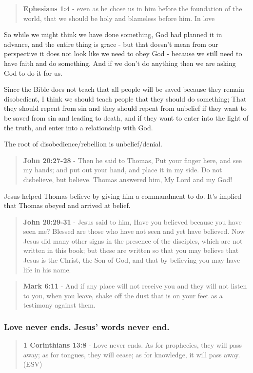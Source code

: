 \documentclass[11pt]{article}
\begin{document}
\begin{quote}
\textbf{Ephesians 1:4} - even as he chose us in him before the foundation of the world, that we should be holy and blameless before him. In love
\end{quote}

So while we might think we have done something, God had planned it in advance, and the entire thing is grace - but that doesn't mean from our perspective it does not look like we need to obey God - because we still need to have faith and do something. And if we don't do anything then we are asking God to do it for us.

Since the Bible does not teach that all people will be saved because they remain disobedient, I think we should teach people that they should do something; That they should repent from sin and they should repent from unbelief if they want to be saved from sin and leading to death, and if they want to enter into the light of the truth, and enter into a relationship with God.

The root of disobedience/rebellion is unbelief/denial.

\begin{quote}
\textbf{John 20:27-28} - Then he said to Thomas, Put your finger here, and see my hands; and put out your hand, and place it in my side. Do not disbelieve, but believe. Thomas answered him, My Lord and my God!
\end{quote}

Jesus helped Thomas believe by giving him a commandment to do. It's implied that Thomas obeyed and arrived at belief.

\begin{quote}
\textbf{John 20:29-31} - Jesus said to him, Have you believed because you have seen me? Blessed are those who have not seen and yet have believed.  Now Jesus did many other signs in the presence of the disciples, which are not written in this book; but these are written so that you may believe that Jesus is the Christ, the Son of God, and that by believing you may have life in his name.
\end{quote}

\begin{quote}
\textbf{Mark 6:11} - And if any place will not receive you and they will not listen to you, when you leave, shake off the dust that is on your feet as a testimony against them.
\end{quote}

\subsubsection{Love never ends. Jesus' words never end.}
\label{sec:org3fdee65}
\begin{quote}
\textbf{1 Corinthians 13:8} -  Love never ends.  As for prophecies, they will pass away; as for tongues, they will cease; as for knowledge, it will pass away. (ESV)
\end{quote}
\end{document}

